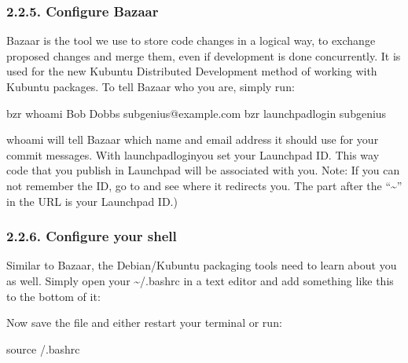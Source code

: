 \documentclass[letterpaper,10pt,english]{sphinxmanual}
\begin{document}
\subsubsection{2.2.5. Configure Bazaar}
\label{\detokenize{docs/packaging-guide/getting-started:configure-bazaar}}
\sphinxAtStartPar
Bazaar is the tool we use to store code changes in a logical way, to exchange proposed changes and merge them, even if development is done concurrently. It is used for the new Kubuntu Distributed Development method of working with Kubuntu packages.
To tell Bazaar who you are, simply run:

\begin{sphinxVerbatim}[commandchars=\\\{\}]
\PYGZdl{} bzr whoami \PYGZdq{}Bob Dobbs \PYGZlt{}subgenius@example.com\PYGZgt{}\PYGZdq{}
\PYGZdl{} bzr launchpad\PYGZhy{}login subgenius
\end{sphinxVerbatim}

\sphinxAtStartPar
whoami will tell Bazaar which name and email address it should use for your commit messages. With launchpad\sphinxhyphen{}loginyou set your Launchpad ID. This way code that you publish in Launchpad will be associated with you.
Note: If you can not remember the ID, go to  and see where it redirects you. The part after the “\textasciitilde{}” in the URL is your Launchpad ID.)


\subsubsection{2.2.6. Configure your shell}
\label{\detokenize{docs/packaging-guide/getting-started:configure-your-shell}}
\sphinxAtStartPar
Similar to Bazaar, the Debian/Kubuntu packaging tools need to learn about you as well. Simply open your \textasciitilde{}/.bashrc in a text editor and add something like this to the bottom of it:

\begin{sphinxVerbatim}[commandchars=\\\{\}]
 
 
\end{sphinxVerbatim}

\sphinxAtStartPar
Now save the file and either restart your terminal or run:

\begin{sphinxVerbatim}[commandchars=\\\{\}]
\PYGZdl{} source \PYGZti{}/.bashrc
\end{sphinxVerbatim}
\end{document}
